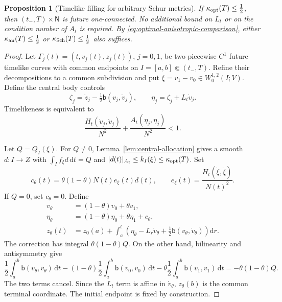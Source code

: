 \documentclass[10pt,a4paper]{article}
\numberwithin{equation}{section}
\newtheorem{proposition}[theorem]{Proposition}
\theoremstyle{definition}
\theoremstyle{remark}
\newcommand{\dd}{\mathrm d}
\begin{document}
\begin{proposition}[Timelike filling for arbitrary Schur metrics]
\label{thm:schur-filling}
If $\kappa_{\rm opt}(T)\le\tfrac12$, then
$(t_-,T)\times\mathsf N$ is future one-connected.  No additional bound on
$L_t$ or on the condition number of $A_t$ is required.  By
\eqref{eq:optimal-anisotropic-comparison}, either
$\kappa_{\rm an}(T)\le\tfrac12$ or
$\kappa_{\rm Sch}(T)\le\tfrac12$ also suffices.
\end{proposition}

\begin{proof}
Let $\Gamma_j(t)=(t,v_j(t),z_j(t))$, $j=0,1$, be two piecewise $C^1$
future timelike curves with common endpoints on $I=[a,b]\Subset(t_-,T)$.
Refine their decompositions to a common subdivision and put
$\xi=v_1-v_0\in W^{1,2}_0(I;V)$.  Define the central body controls
\begin{equation}
 \zeta_j=\dot z_j-\tfrac12\mathsf b(v_j,\dot v_j),
 \qquad \eta_j=\zeta_j+L_t\dot v_j.
 \label{eq:body-controls}
\end{equation}
Timelikeness is equivalent to
\begin{equation}
 \frac{H_t(\dot v_j,\dot v_j)}{N^2}
 +\frac{A_t(\eta_j,\eta_j)}{N^2}<1.
 \label{eq:timelike-controls}
\end{equation}

Let $Q=Q_I(\xi)$.  For $Q\ne0$, Lemma~\ref{lem:central-allocation}
gives a smooth $d:I\to Z$ with
$\int_I f_\xi d\,\dd t=Q$ and
$|d(t)|_{A_t}\le k_I(\xi)\le\kappa_{\rm opt}(T)$.  Set
\begin{equation}
 c_\theta(t)=\theta(1-\theta)N(t)e_\xi(t)d(t),\qquad
 e_\xi(t)=\frac{H_t(\dot\xi,\dot\xi)}{N(t)^2}.
 \label{eq:distributed-correction}
\end{equation}
If $Q=0$, set $c_\theta=0$.  Define
\begin{align}
 v_\theta&=(1-\theta)v_0+\theta v_1,
 \label{eq:v-theta}\\
 \eta_\theta&=(1-\theta)\eta_0+\theta\eta_1+c_\theta,
 \label{eq:eta-theta}\\
 z_\theta(t)&=z_0(a)+\int_a^t\left(
 \eta_\theta-L_r\dot v_\theta
 +\tfrac12\mathsf b(v_\theta,\dot v_\theta)\right)\dd r.
 \label{eq:z-theta}
\end{align}
The correction has integral $\theta(1-\theta)Q$.  On the other hand,
bilinearity and antisymmetry give
\begin{equation}
 \frac12\int_a^b\mathsf b(v_\theta,\dot v_\theta)\,\dd t
 -(1-\theta)\frac12\int_a^b\mathsf b(v_0,\dot v_0)\,\dd t
 -\theta\frac12\int_a^b\mathsf b(v_1,\dot v_1)\,\dd t
 =-\theta(1-\theta)Q.
 \label{eq:bracket-defect}
\end{equation}
The two terms cancel.  Since the $L_t$ term is affine in $\dot v_\theta$,
$z_\theta(b)$ is the common terminal coordinate.  The initial endpoint is
fixed by construction.


\end{proof}
\end{document}
